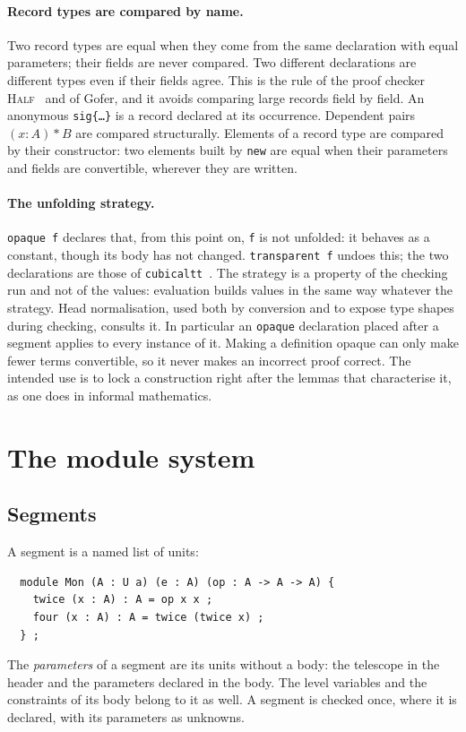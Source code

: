 \documentclass[11pt]{article}
\newcommand{\kw}[1]{\texttt{#1}}
\theoremstyle{remark}
\begin{document}
\paragraph{Record types are compared by name.} Two record types are
equal when they come from the same declaration with equal parameters;
their fields are never compared. Two different declarations are
different types even if their fields agree. This is the rule of the
proof checker \textsc{Half}~\cite{Ced} and of Gofer, and it avoids
comparing large records field by field. An anonymous \kw{sig\{\dots\}} is
a record declared at its occurrence. Dependent pairs $(x:A)*B$ are
compared structurally. Elements of a record type are compared by their
constructor: two elements built by \kw{new} are equal when their
parameters and fields are convertible, wherever they are written.

\paragraph{The unfolding strategy.} \kw{opaque f} declares that, from this
point on, \kw{f} is not unfolded: it behaves as a constant, though its
body has not changed. \kw{transparent f} undoes this; the two
declarations are those of \texttt{cubicaltt}~\cite{cubicaltt}. The strategy is a
property of the checking run and not of the values: evaluation builds
values in the same way whatever the strategy. Head normalisation, used
both by conversion and to expose type shapes during checking, consults
it. In particular an \kw{opaque} declaration placed after a segment
applies to every instance of it. Making a definition opaque can only make
fewer terms convertible, so it never makes an incorrect proof correct.
The intended use is to lock a construction right after the lemmas that
characterise it, as one does in informal mathematics.

\section{The module system}\label{sec:modules}

\subsection{Segments}

A segment is a named list of units:
\begin{verbatim}
  module Mon (A : U a) (e : A) (op : A -> A -> A) {
    twice (x : A) : A = op x x ;
    four (x : A) : A = twice (twice x) ;
  } ;
\end{verbatim}
The \emph{parameters} of a segment are its units without a body: the
telescope in the header and the parameters declared in the body. The
level variables and the constraints of its body belong to it as well. A
segment is checked once, where it is declared, with its parameters as
unknowns.
\end{document}
